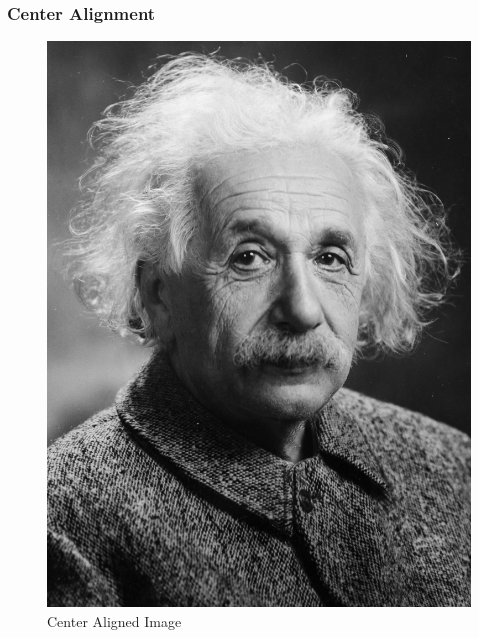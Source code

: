 \documentclass[twocolumn]{article}
\begin{document}
\subsubsection{Center Alignment}
\begin{figure}[htbp]
    \centering
    \includegraphics{Images/Albert_Einstein.png}
    \caption{Center Aligned Image}
\end{figure}
\pagebreak
\end{document}
